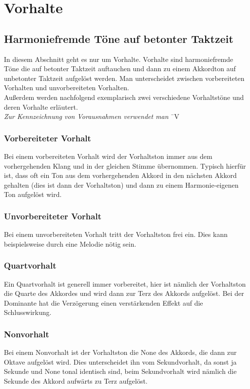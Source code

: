 \documentclass[a4paper]{article}
\begin{document}
	\section{Vorhalte}
	
	\subsection{Harmoniefremde Töne auf betonter Taktzeit}
	In diesem Abschnitt geht es nur um Vorhalte. Vorhalte sind harmoniefremde Töne die auf betonter Taktzeit auftauchen und dann zu einem Akkordton auf unbetonter Taktzeit aufgelöst werden. Man unterscheidet zwischen vorbereiteten Vorhalten und unvorbereiteten Vorhalten.\\ Außerdem werden nachfolgend exemplarisch zwei verschiedene Vorhaltstöne und deren Vorhalte erläutert.\\
	\textit{Zur Kennzeichnung von Vorausnahmen verwendet man} ¯V %
	
	\subsubsection{Vorbereiteter Vorhalt}
	Bei einem vorbereiteten Vorhalt wird der Vorhaltston immer aus dem vorhergehenden Klang und in der gleichen Stimme übernommen. Typisch hierfür ist, dass oft ein Ton aus dem vorhergehenden Akkord in den nächsten Akkord gehalten (dies ist dann der Vorhaltston) und dann zu einem Harmonie-eigenen Ton aufgelöst wird.
	
	\subsubsection{Unvorbereiteter Vorhalt}
	Bei einem unvorbereiteten Vorhalt tritt der Vorhaltston frei ein. Dies kann beispielsweise durch eine Melodie nötig sein.
	
	\subsubsection{Quartvorhalt}
	Ein Quartvorhalt ist generell immer vorbereitet, hier ist nämlich der Vorhaltston die Quarte des Akkordes und wird dann zur Terz des Akkords aufgelöst. Bei der Dominante hat die Verzögerung einen verstärkenden Effekt auf die Schlusswirkung.
	
	\subsubsection{Nonvorhalt}
	Bei einem Nonvorhalt ist der Vorhaltston die None des Akkords, die dann zur Oktave aufgelöst wird. Dies unterscheidet ihn vom Sekundvorhalt, da sonst ja Sekunde und None tonal identisch sind, beim Sekundvorhalt wird nämlich die Sekunde des Akkord aufwärts zu Terz aufgelöst.\\
	
\end{document}
